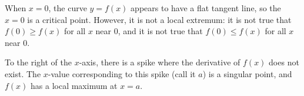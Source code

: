 \begin{solution}
\begin{center}\end{center}
When $x=0$, the curve $y=f(x)$ appears to have a flat tangent line, so the $x=0$ is a critical point. However, it is not a local extremum: it is not true that $f(0) \geq f(x)$ for all $x$ near 0, and it is not true that $f(0) \leq f(x)$ for all $x$ near 0.

To the right of the $x$-axis, there is a spike where the derivative of $f(x)$ does not exist. The $x$-value corresponding to this spike (call it $a$) is a singular point, and $f(x)$ has a local maximum at $x=a$.
\end{solution}


